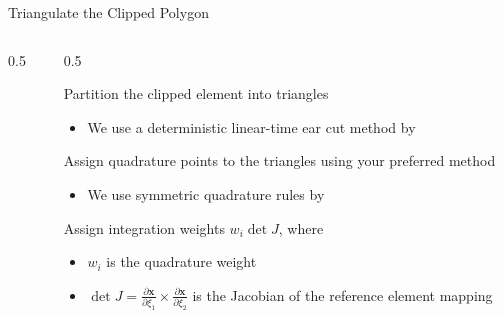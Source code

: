 \documentclass{cubeamer}
\newlength{\textheightwithtitle}
\newenvironment{twocolimgleft}[2][width=\textwidth,height=\textheightwithtitle]
{\begin{columns}
    \begin{column}{0.5\textwidth}
         
     \end{column}
    \begin{column}{0.5\textwidth}
    }
    {
    \end{column}
\end{columns}}
\newcommand{\coverflag}{<+->}
\newenvironment{flagitemize}
  {\expandafter\itemize\expandafter[\coverflag]}
  {\enditemize}
\begin{document}
\begin{frame}{Triangulate the Clipped Polygon}
\begin{twocolimgleft}{img/segmentation_step_04.svg}
    \begin{flagitemize}
        \item Partition the clipped element into triangles
        \begin{itemize}
            \item We use a deterministic linear-time ear cut method by \cite{Livesu_Cherchi_Scateni_Attene_2022}
        \end{itemize}
        \item Assign quadrature points to the triangles using your preferred method
        \begin{itemize}
            \item We use symmetric quadrature rules by \cite{JaskowiecSukumar2021}
        \end{itemize}
        \item Assign integration weights $w_i \det J$, where 
        \begin{itemize}
            \item $w_i$ is the quadrature weight
            \item $\det J = \frac{\partial \bm x}{\partial\xi_1} \times \frac{\partial \bm x}{\partial\xi_2}$ is the Jacobian of the reference element mapping
        \end{itemize}
    \end{flagitemize}
\end{twocolimgleft}
\end{frame}
\end{document}
